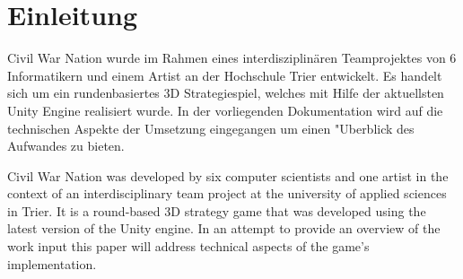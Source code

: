 \chapter{Einleitung}

Civil War Nation wurde im Rahmen eines interdisziplinären Teamprojektes von 6 Informatikern und einem Artist an der Hochschule Trier entwickelt. Es handelt sich um ein rundenbasiertes 3D Strategiespiel, welches mit Hilfe der aktuellsten Unity Engine realisiert wurde. 
In der vorliegenden Dokumentation wird auf die technischen Aspekte der Umsetzung eingegangen um einen "Uberblick des Aufwandes zu bieten. \newline

Civil War Nation was developed by six computer scientists and one artist in the context of an interdisciplinary team project at the university of applied sciences in Trier. It is a round-based 3D strategy game that was developed using the latest version of the Unity engine. In an attempt to provide an overview of the work input this paper will address technical aspects of the game's implementation.